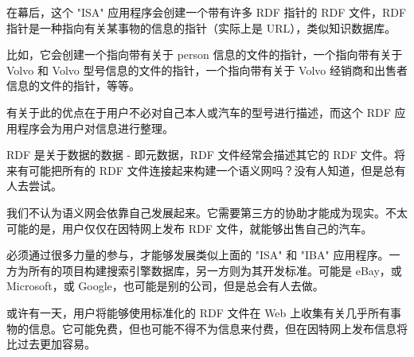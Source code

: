 在幕后，这个 "ISA" 应用程序会创建一个带有许多 RDF 指针的 RDF 文件，RDF 指针是一种指向有关某事物的信息的指针（实际上是 URL），类似知识数据库。

比如，它会创建一个指向带有关于 person 信息的文件的指针，一个指向带有关于 Volvo 和 Volvo 型号信息的文件的指针，一个指向带有关于 Volvo 经销商和出售者信息的文件的指针，等等。


有关于此的优点在于用户不必对自己本人或汽车的型号进行描述，而这个 RDF 应用程序会为用户对信息进行整理。


RDF 是关于数据的数据 - 即元数据，RDF 文件经常会描述其它的 RDF 文件。将来有可能把所有的 RDF 文件连接起来构建一个语义网吗？没有人知道，但是总有人去尝试。


我们不认为语义网会依靠自己发展起来。它需要第三方的协助才能成为现实。不太可能的是，用户仅仅在因特网上发布 RDF 文件，就能够出售自己的汽车。

必须通过很多力量的参与，才能够发展类似上面的 "ISA" 和 "IBA" 应用程序。一方为所有的项目构建搜索引擎数据库，另一方则为其开发标准。可能是 eBay，或 Microsoft，或 Google，也可能是别的公司，但是总会有人去做。


或许有一天，用户将能够使用标准化的 RDF 文件在 Web 上收集有关几乎所有事物的信息。它可能免费，但也可能不得不为信息来付费，但在因特网上发布信息将比过去更加容易。














